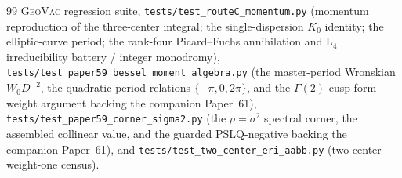 \documentclass[aps,pra,twocolumn,superscriptaddress,longbibliography]{revtex4-2}
\begin{document}
\begin{thebibliography}{99}
\textsc{GeoVac} regression suite, \texttt{tests/test\_routeC\_momentum.py}
(momentum reproduction of the three-center integral; the single-dispersion
$K_{0}$ identity; the elliptic-curve period; the rank-four Picard--Fuchs
annihilation and $\mathrm{L}_{4}$ irreducibility battery / integer monodromy),
\texttt{tests/test\_paper59\_bessel\_moment\_algebra.py} (the master-period
Wronskian $W_{0}D^{-2}$, the quadratic period relations $\{-\pi,0,2\pi\}$, and
the $\Gamma(2)$ cusp-form-weight argument backing the companion Paper~61),
\texttt{tests/test\_paper59\_corner\_sigma2.py} (the $\rho=\sigma^{2}$ spectral
corner, the assembled collinear value, and the guarded PSLQ-negative backing the companion Paper~61), and
\texttt{tests/test\_two\_center\_eri\_aabb.py} (two-center weight-one census).

\end{thebibliography}
\end{document}
